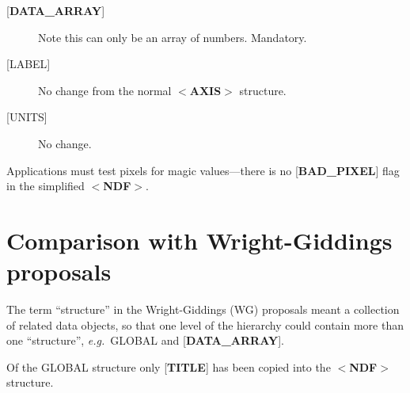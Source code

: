 \begin{description}
\item [{[}{\bf DATA\_ARRAY}{]}]  Note this can only be an array of numbers. 
Mandatory.
\item [{[}LABEL{]}]  No change from the normal $<${\bf AXIS}$>$ structure.
\item [{[}UNITS{]}]  No change.
\end{description}
Applications must test pixels for magic values---there is no
{[}{\bf BAD\_PIXEL}{]} flag in the simplified $<${\bf NDF}$>$.

\section{Comparison with Wright-Giddings proposals\label{se:comparison}}

The term ``structure'' in the Wright-Giddings (WG) proposals meant
a collection of related data objects, so that one level of the hierarchy
could contain more than one ``structure'', {\it e.g.}\  GLOBAL and
{[}{\bf DATA\_ARRAY}{]}. 

Of the GLOBAL structure only {[}{\bf TITLE}{]} has been copied into the
$<${\bf NDF}$>$ structure.

